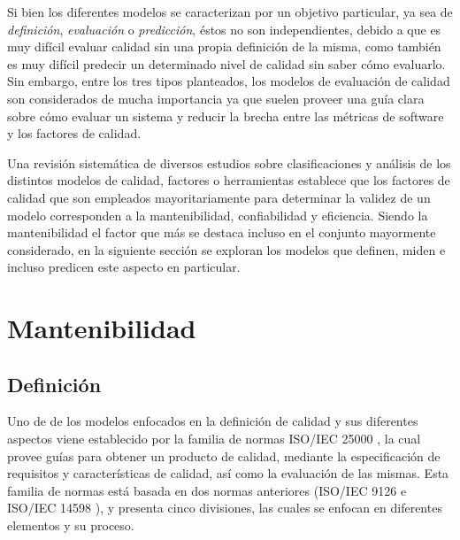 Si bien los diferentes modelos se caracterizan por un objetivo particular, ya sea de
\textit{definición}, \textit{evaluación} o \textit{predicción}, éstos no son independientes,
debido a que es muy difícil evaluar calidad sin una propia definición de la misma, como también
es muy difícil predecir un determinado nivel de calidad sin saber cómo evaluarlo.
Sin embargo, entre los tres tipos planteados, los modelos de evaluación de calidad son considerados
de mucha importancia ya que suelen proveer una guía clara sobre cómo evaluar un sistema y reducir
la brecha entre las métricas de software y los factores de calidad.

Una revisión sistemática de diversos estudios sobre clasificaciones y análisis de los distintos
modelos de calidad, factores o herramientas \cite{Yin} establece que los factores de calidad
que son empleados mayoritariamente para determinar la validez de un modelo corresponden a la
mantenibilidad, confiabilidad y eficiencia.
Siendo la mantenibilidad el factor que más se destaca incluso en el conjunto mayormente
considerado, en la siguiente sección se exploran los modelos que definen, miden e incluso
predicen este aspecto en particular.

\section{Mantenibilidad}

\subsection{Definición}

Uno de de los modelos enfocados en la definición de calidad y sus diferentes aspectos
viene establecido por la familia de normas ISO/IEC 25000 \cite{ref}, 
la cual provee guías para obtener un producto de calidad, mediante la especificación 
de requisitos y características de calidad, así como la evaluación de las mismas.
Esta familia de normas está basada en dos normas anteriores (ISO/IEC 9126 \cite{ref}
e ISO/IEC 14598 \cite{ref}), y presenta cinco divisiones, las cuales se enfocan en diferentes
elementos y su proceso.

